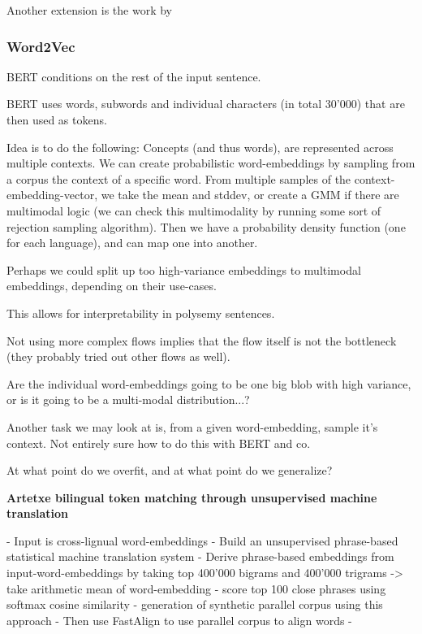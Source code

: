 \documentclass[a4paper,12pt,oneside,openright]{report}
\begin{document}
Another extension is the work by  


\newpage
\subsubsection{Word2Vec}

BERT conditions on the rest of the input sentence.

BERT uses words, subwords and individual characters (in total 30'000) that are then used as tokens.

Idea is to do the following:
Concepts (and thus words), are represented across multiple contexts.
We can create probabilistic word-embeddings by sampling from a corpus the context of a specific word.
From multiple samples of the context-embedding-vector, we take the mean and stddev, or create a GMM if there are multimodal logic (we can check this multimodality by running some sort of rejection sampling algorithm).
Then we have a probability density function (one for each language), and can map one into another.

Perhaps we could split up too high-variance embeddings to multimodal embeddings, depending on their use-cases.

This allows for interpretability in polysemy sentences.

Not using more complex flows implies that the flow itself is not the bottleneck (they probably tried out other flows as well).

Are the individual word-embeddings going to be one big blob with high variance, or is it going to be a multi-modal distribution...?

Another task we may look at is, from a given word-embedding, sample it's context. 
Not entirely sure how to do this with BERT and co.

At what point do we overfit, and at what point do we generalize?


\textbf{Artetxe bilingual token matching through unsupervised machine translation}

- Input is cross-lignual word-embeddings
- Build an unsupervised phrase-based statistical machine translation system
- Derive phrase-based embeddings from input-word-embeddings by taking top 400'000 bigrams and 400'000 trigrams -> take arithmetic mean of word-embedding
- score top 100 close phrases using softmax cosine similarity
- generation of synthetic parallel corpus using this approach
- Then use FastAlign to use parallel corpus to align words
- 
\end{document}

